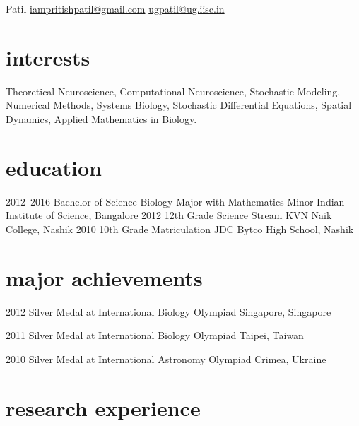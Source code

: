 \documentclass[11pt,print]{friggeri-cv}%
\begin{document}
 {Patil} 
        {\href{mailto:iampritishpatil@gmail.com}{iampritishpatil@gmail.com}\quad  
    \href{mailto:ugpatil@ug.iisc.in}{ugpatil@ug.iisc.in}
}



\section{interests}

Theoretical Neuroscience, Computational Neuroscience, Stochastic Modeling, Numerical Methods, Systems Biology, Stochastic Differential Equations, Spatial Dynamics, Applied Mathematics in Biology.




\section{education}

\begin{entrylist}
  \entryyy
    {2012--2016}
    {Bachelor of Science {\normalfont Biology Major with Mathematics Minor } \prntlen{\textwidth} }
    {Indian Institute of Science, Bangalore}
  \entryyy
    {2012}
    {12th Grade {\normalfont Science Stream} \prntlen{\mylength}}
  {KVN Naik College, Nashik}
  \entryyy
    {2010}
    {10th Grade     {\normalfont Matriculation} \prntlen{\hsize}}
    {JDC Bytco High School, Nashik}
\end{entrylist}


\section{major achievements}
\begin{entrylist}
  \entryyy
    {2012}
    { {\normalfont Silver Medal at }International Biology Olympiad     }
    {Singapore, Singapore}
    
  \entryyy
    {2011}
    {  {\normalfont Silver Medal at }International Biology Olympiad}
    {Taipei, Taiwan}
    
  \entryyy
    {2010}
    { {\normalfont Silver Medal at }International Astronomy Olympiad }
    {Crimea, Ukraine}



\end{entrylist}

\section{research experience}
\end{document}
